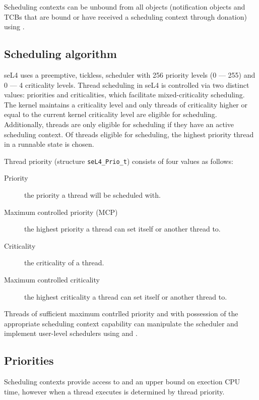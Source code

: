 Scheduling contexts can be unbound from all objects (notification objects and TCBs that are bound or have received a scheduling context through donation) using .

\subsection{Scheduling algorithm}
\label{sec:sched}

seL4 uses a preemptive, tickless, scheduler with 256 priority levels (0 --- 255) and 0 --- 4 criticality levels.
Thread scheduling in seL4 is controlled via two distinct values: priorities and criticalities, which facilitate mixed-criticality scheduling.
The kernel maintains a criticality level and only threads of criticality higher or equal to the current kernel criticality level are eligible for scheduling.
Additionally, threads are only eligible for scheduling if they have an active scheduling context.
Of threads eligible for scheduling, the highest priority thread in a runnable state is chosen.

Thread priority (structure \texttt{seL4\_Prio\_t}) consists of four values as follows:

\begin{description}
    \item[Priority] the priority a thread will be scheduled with.
    \item[Maximum controlled priority (MCP)] the highest priority a thread can set itself or another thread to.
    \item[Criticality] the criticality of a thread.
    \item[Maximum controlled criticality] the highest criticality a thread can set itself or another thread to. 
\end{description}

Threads of sufficient maximum contrlled priority and with possession of the appropriate scheduling context capability can manipulate the scheduler and implement user-level schedulers using  and .

\subsection{Priorities}

Scheduling contexts provide access to and an upper bound on exection CPU time, however when a thread executes is determined by thread priority.

